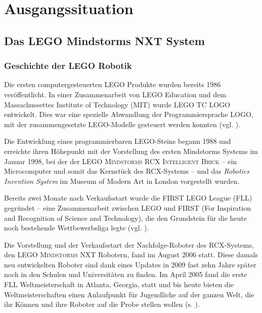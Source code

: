 \documentclass[paper=a4, DIV=calc, BCOR=12mm, twoside=on, onecolumn=on, open = right, titlepage =on, parskip =half-, headsepline = on, footsepline = off, chapterprefix = off, appendixprefix = on, fontsize = 12pt, numbers = noenddot, abstract = on]{scrbook}
\begin{document}
\chapter{Ausgangssituation}

\par\singlespacing
\section{Das LEGO Mindstorms NXT System}
\onehalfspacing
\subsection{Geschichte der \textsc{LEGO} Robotik}
Die ersten computergesteuerten \textsc{LEGO} Produkte wurden bereits 1986 veröffentlicht. In einer Zusammenarbeit von \textsc{LEGO} Education und dem Massachussettes Institute of Technology (MIT) wurde \textsc{LEGO TC LOGO} entwickelt. Dies war eine spezielle Abwandlung der Programmiersprache LOGO, mit der zusammengesetzte \textsc{LEGO}-Modelle gesteuert werden konnten (vgl. \cite{rolling:14}).

Die Entwicklung eines programmierbaren \textsc{LEGO}-Steins begann 1988 und erreichte ihren Höhepunkt mit der Vorstellung des ersten Mindstorms Systems im Januar 1998, bei der der \textsc{LEGO Mindstorms RCX Intelligent Brick} -- ein Microcomputer und somit das Kernstück des RCX-Systems -- und das \emph{Robotics Invention System} im Museum of Modern Art in London vorgestellt wurden.

Bereits zwei Monate nach Verkaufsstart wurde die FIRST LEGO League (FLL) gegründet -- eine Zusammenarbeit zwischen \textsc{LEGO} und FIRST (For Inspiration and Recognition of Science and Technology), die den Grundstein für die heute noch bestehende Wettbewerbsliga legte (vgl. \cite{rolling:14}).

Die Vorstellung und der Verkaufsstart der Nachfolge-Roboter des RCX-Systems, den \textsc{LEGO Mindstorms} NXT Robotern, fand im August 2006 statt. Diese damals neu entwickelten Roboter sind dank eines Updates in 2009 fast zehn Jahre später noch in den Schulen und Universitäten zu finden. Im April 2005 fand die erste FLL Weltmeisterschaft in Atlanta, Georgia, statt und bis heute bieten die Weltmeisterschaften einen Anlaufpunkt für Jugendliche auf der ganzen Welt, die ihr Können und ihre Roboter auf die Probe stellen wollen (s. \cite{lego}).

\par \singlespacing
\end{document}

